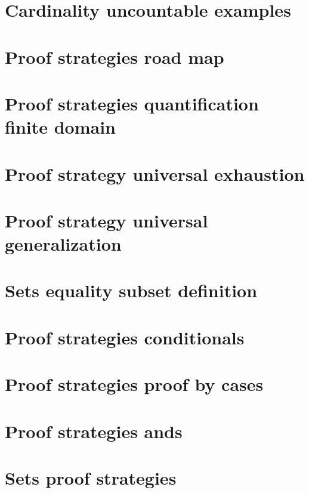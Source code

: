 \section*{Cardinality uncountable examples}

\vfill
\section*{Proof strategies road map}

\vfill
\section*{Proof strategies quantification finite domain}

\vfill
\section*{Proof strategy universal exhaustion}

\vfill
\section*{Proof strategy universal generalization}

\vfill
\section*{Sets equality subset definition}

\vfill
\section*{Proof strategies conditionals}

\vfill
\section*{Proof strategies proof by cases}

\vfill
\section*{Proof strategies ands}

\vfill
\section*{Sets proof strategies}

\vfill

